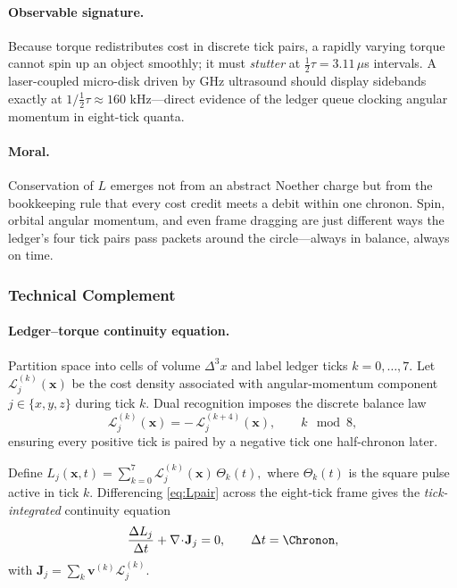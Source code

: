 \documentclass[11pt,oneside]{book}
\begin{document}
\paragraph{Observable signature.}
Because torque redistributes cost in discrete tick pairs, a rapidly
varying torque cannot spin up an object smoothly; it must
\emph{stutter} at $\tfrac12\tau = 3.11\,\mu$s intervals.
A laser-coupled micro-disk driven by GHz ultrasound should display
sidebands exactly at $1/\!\tfrac12\tau \approx 160$ kHz—direct evidence
of the ledger queue clocking angular momentum in eight-tick quanta.

\paragraph{Moral.}
Conservation of $L$ emerges not from an abstract Noether charge but
from the bookkeeping rule that every cost credit meets a debit within
one chronon.  
Spin, orbital angular momentum, and even frame dragging are just
different ways the ledger’s four tick pairs pass packets around the
circle—always in balance, always on time.


\subsubsection*{Technical Complement}

\paragraph{Ledger–torque continuity equation.}
Partition space into cells of volume $\Delta^{3}x$ and label ledger
ticks $k=0,\dots,7$.  
Let $\mathcal L^{(k)}_{j}(\mathbf x)$ be the cost density associated
with angular-momentum component $j\!\in\!\{x,y,z\}$ during tick $k$.
Dual recognition imposes the discrete balance law
%
\begin{equation}
   \mathcal L^{(k)}_{j}(\mathbf x)
   = -\,\mathcal L^{(k+4)}_{j}(\mathbf x),
   \qquad k\!\!\!\mod 8,
   \label{eq:Lpair}
\end{equation}
%
ensuring every positive tick is paired by a negative tick one
half-chronon later.

Define
\(
   L_{j}(\mathbf x,t)
   =\sum_{k=0}^{7}\mathcal L^{(k)}_{j}(\mathbf x)\,
    \Theta_{k}(t),
\)
where $\Theta_{k}(t)$ is the square pulse active in tick $k$.
Differencing \eqref{eq:Lpair} across the eight‐tick frame gives the
\emph{tick-integrated} continuity equation
%
\begin{equation}
   \frac{\Delta L_{j}}{\Delta t}
   +\nabla\!\cdot\!\mathbf J_{j}
   = 0,
   \qquad
   \Delta t=\Chronon ,
   \label{eq:disc-cont}
\end{equation}
%
with \(
  \mathbf J_{j}
  = \sum_{k}\mathbf v^{(k)}\mathcal L^{(k)}_{j}.
\)
\end{document}
